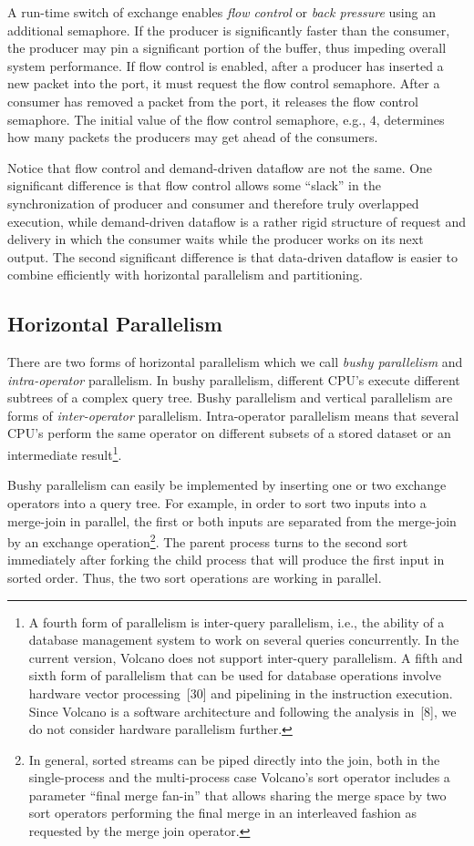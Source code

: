 \documentclass[a4paper,11pt,notitlepage,twoside,openright]{article}
\begin{document}
A run-time switch of exchange enables \emph{flow control}
or \emph{back pressure} using an additional semaphore. If the
producer is significantly faster than the consumer, the producer
may pin a significant portion of the buffer, thus impeding
overall system performance. If flow control is enabled,
after a producer has inserted a new packet into the port, it
must request the flow control semaphore. After a consumer
has removed a packet from the port, it releases the flow
control semaphore. The initial value of the flow control
semaphore, e.g., $4$, determines how many packets the
producers may get ahead of the consumers.

Notice that flow control and demand-driven dataflow
are not the same. One significant difference is that flow
control allows some ``slack'' in the synchronization of
producer and consumer and therefore truly overlapped execution,
while demand-driven dataflow is a rather rigid structure
of request and delivery in which the consumer waits
while the producer works on its next output. The second
significant difference is that data-driven dataflow is easier to
combine efficiently with horizontal parallelism and partitioning.

\subsection{Horizontal Parallelism}

There are two forms of horizontal parallelism which
we call \emph{bushy parallelism} and \emph{intra-operator} parallelism. In
bushy parallelism, different CPU's execute different subtrees
of a complex query tree. Bushy parallelism and vertical
parallelism are forms of \emph{inter-operator} parallelism. Intra-operator
parallelism means that several CPU's perform the
same operator on different subsets of a stored dataset or an
intermediate result\footnote{%
A fourth form of parallelism is inter-query parallelism,
i.e., the ability of a database management system to work on
several queries concurrently. In the current version, Volcano
does not support inter-query parallelism. A fifth and sixth form
of parallelism that can be used for database operations involve
hardware vector processing~{[30]} and pipelining in the instruction
execution. Since Volcano is a software architecture and following
the analysis in~{[8]}, we do not consider hardware parallelism further.
}.

Bushy parallelism can easily be implemented by
inserting one or two exchange operators into a query tree.
For example, in order to sort two inputs into a merge-join
in parallel, the first or both inputs are separated from the
merge-join by an exchange operation\footnote{%
In general, sorted streams can be piped directly into the
join, both in the single-process and the multi-process case
Volcano's sort operator includes a parameter ``final merge fan-in''
that allows sharing the merge space by two sort operators performing
the final merge in an interleaved fashion as requested by
the merge join operator.
}. The parent process
turns to the second sort immediately after forking the child
process that will produce the first input in sorted order.
Thus, the two sort operations are working in parallel.
\end{document}
